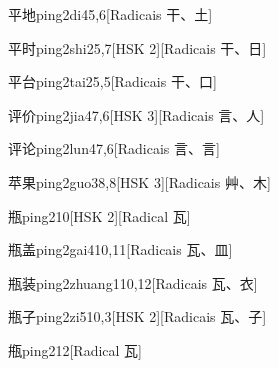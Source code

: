 \begin{entry}{平地}{ping2di4}{5,6}[Radicais ⼲、⼟]
\end{entry}

\begin{entry}{平时}{ping2shi2}{5,7}[HSK 2][Radicais ⼲、⽇]
\end{entry}

\begin{entry}{平台}{ping2tai2}{5,5}[Radicais ⼲、⼝]
\end{entry}

\begin{entry}{评价}{ping2jia4}{7,6}[HSK 3][Radicais ⾔、⼈]
\end{entry}

\begin{entry}{评论}{ping2lun4}{7,6}[Radicais ⾔、⾔]
\end{entry}

\begin{entry}{苹果}{ping2guo3}{8,8}[HSK 3][Radicais ⾋、⽊]
\end{entry}

\begin{entry}{瓶}{ping2}{10}[HSK 2][Radical ⽡]
\end{entry}

\begin{entry}{瓶盖}{ping2gai4}{10,11}[Radicais ⽡、⽫]
\end{entry}

\begin{entry}{瓶装}{ping2zhuang1}{10,12}[Radicais ⽡、⾐]
\end{entry}

\begin{entry}{瓶子}{ping2zi5}{10,3}[HSK 2][Radicais ⽡、⼦]
\end{entry}

\begin{entry}{甁}{ping2}{12}[Radical ⽡]
\end{entry}

